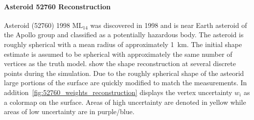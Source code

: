 \paragraph{Asteroid 52760 Reconstruction}
Asteroid (\num{52760}) \num{1998} \(\text{ML}_{14}\) was discovered in \num{1998} and is near Earth asteroid of the Apollo group and classified as a potentially hazardous body.
The asteroid is roughly spherical with a mean radius of approximately \SI{1}{\kilo\meter}.
The initial shape estimate is assumed to be spherical with approximately the same number of vertices as the truth model.
 show the shape reconstruction at several discrete points during the simulation.
Due to the roughly spherical shape of the asteorid large portions of the surface are quickly modified to match the measurements.
In addition~\cref{fig:52760_weights_reconstruction} displays the vertex uncertainty \( w_i \) as a colormap on the surface. 
Areas of high uncertainty are denoted in yellow while areas of low uncertainty are in purple/blue.

